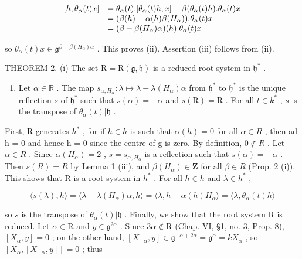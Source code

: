 \[
\begin{array}{r l} [ h, \theta_ {\alpha} (t) x ] & = \theta_ {\alpha} (t). [ \theta_ {\alpha} (t) h, x ] - \beta (\theta_ {\alpha} (t) h). \theta_ {\alpha} (t) x \\ & = (\beta (h) - \alpha (h) \beta (H _ {\alpha})). \theta_ {\alpha} (t) x \\ & = (\beta - \beta (H _ {\alpha}) \alpha) (h). \theta_ {\alpha} (t) x \end{array}
\]

so \(\theta_{\alpha}(t)x\in \mathfrak{g}^{\beta -\beta (H_{\alpha})\alpha}\) . This proves (ii). Assertion (iii) follows from (ii).

THEOREM 2. (i) The set \(\mathrm{R} = \mathrm{R}(\mathfrak{g},\mathfrak{h})\) is a reduced root system in \(\mathfrak{h}^*\) .

\begin{enumerate}
\def\labelenumi{(\roman{enumi})}
\setcounter{enumi}{1}
\tightlist
\item
  Let \(\alpha \in \mathbb{R}\) . The map \(s_{\alpha, H_\alpha}: \lambda \mapsto \lambda - \lambda(H_\alpha)\alpha\) from \(\mathfrak{h}^*\) to \(\mathfrak{h}^*\) is the unique reflection \(s\) of \(\mathfrak{h}^*\) such that \(s(\alpha) = -\alpha\) and \(s(\mathrm{R}) = \mathrm{R}\) . For all \(t \in k^*\) , \(s\) is the transpose of \(\theta_\alpha(t)|\mathfrak{h}\) .
\end{enumerate}

First, R generates \(h^{*}\) , for if \(h \in h\) is such that \(\alpha(h) = 0\) for all \(\alpha \in R\) , then ad h = 0 and hence h = 0 since the centre of g is zero. By definition, \(0 \notin R\) . Let \(\alpha \in R\) . Since \(\alpha(H_{\alpha}) = 2\) , \(s = s_{\alpha,H_{\alpha}}\) is a reflection such that \(s(\alpha) = -\alpha\) . Then \(s(R) = R\) by Lemma 1 (iii), and \(\beta(H_{\alpha}) \in \mathbf{Z}\) for all \(\beta \in R\) (Prop. 2 (i)). This shows that R is a root system in \(h^{*}\) . For all \(h \in h\) and \(\lambda \in h^{*}\) ,

\[
\langle s (\lambda), h \rangle = \langle \lambda - \lambda (H _ {\alpha}) \alpha , h \rangle = \langle \lambda , h - \alpha (h) H _ {\alpha} \rangle = \langle \lambda , \theta_ {\alpha} (t) h \rangle
\]

so \(s\) is the transpose of \(\theta_{\alpha}(t)|\mathfrak{h}\) . Finally, we show that the root system R is reduced. Let \(\alpha \in \mathrm{R}\) and \(y \in \mathfrak{g}^{2\alpha}\) . Since \(3\alpha \notin \mathrm{R}\) (Chap. VI, §1, no. 3, Prop. 8), \([X_{\alpha}, y] = 0\) ; on the other hand, \([X_{-\alpha}, y] \in \mathfrak{g}^{-\alpha + 2\alpha} = \mathfrak{g}^{\alpha} = kX_{\alpha}\) , so \([X_{\alpha}, [X_{-\alpha}, y]] = 0\) ; thus

